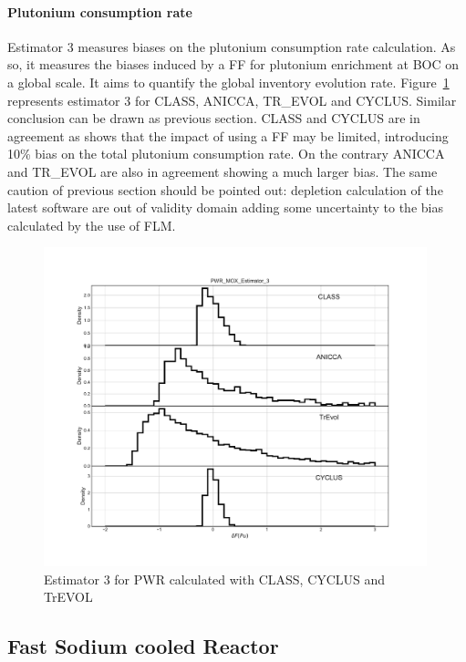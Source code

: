 \paragraph{Plutonium consumption rate}

Estimator 3 measures biases on the plutonium consumption rate calculation. As
so, it measures the biases induced by a \gls{FF} for plutonium enrichment at \gls{BOC} on a
global scale. It aims to quantify the global inventory evolution rate.
Figure~\ref{fig:Est3_PWR} represents estimator 3 for CLASS, ANICCA, TR\_EVOL and
CYCLUS. Similar conclusion can be drawn as previous section. CLASS and CYCLUS
are in agreement as shows that the impact of using a \gls{FF} may be limited,
introducing 10\% bias on the total plutonium consumption rate. On the contrary
ANICCA and TR\_EVOL are also in agreement showing a much larger bias. The same
caution of previous section should be pointed out: depletion calculation of the
latest software are out of validity domain adding some uncertainty to the bias
calculated by the use of \gls{FLM}.       

\begin{figure}[h]
	\begin{center}
		\includegraphics[width = 0.99\textwidth]{../../Feature_1/RAW_DATA/FIG/PWR_MOX_Estimator_3.pdf}
		\caption{Estimator 3 for \gls{PWR} calculated with CLASS, CYCLUS and TrEVOL}
		\label{fig:Est3_PWR}
	\end{center}
\end{figure}

\subsection{Fast Sodium cooled Reactor}
